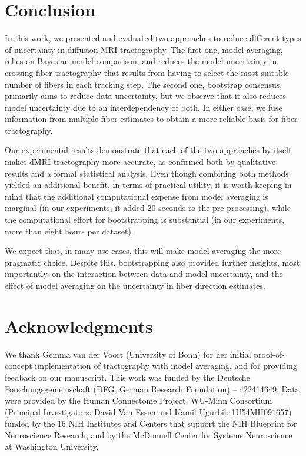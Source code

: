 \section{Conclusion}
\label{sec:conclusion}
In this work, we presented and evaluated two approaches to reduce different types of uncertainty in diffusion MRI tractography. The first one, model averaging, relies on Bayesian model comparison, and reduces the model uncertainty in crossing fiber tractography that results from having to select the most suitable number of fibers in each tracking step. The second one, bootstrap consensus, primarily aims to reduce data uncertainty, but we observe that it also reduces model uncertainty due to an interdependency of both. In either case, we fuse information from multiple fiber estimates to obtain a more reliable basis for fiber tractography.

Our experimental results demonstrate that each of the two approaches by itself makes dMRI tractography more accurate, as confirmed both by qualitative results and a formal statistical analysis. Even though combining both methods yielded an additional benefit, in terms of practical utility, it is worth keeping in mind that the additional computational expense from model averaging is marginal (in our experiments, it added 20 seconds to the pre-processing), while the computational effort for bootstrapping is substantial (in our experiments, more than eight hours per dataset).

We expect that, in many use cases, this will make model averaging the more pragmatic choice. Despite this, bootstrapping also provided further insights, most importantly, on the interaction between data and model uncertainty, and the effect of model averaging on the uncertainty in fiber direction estimates.

\section*{Acknowledgments}

We thank Gemma van der Voort (University of Bonn) for her initial proof-of-concept implementation of tractography with model averaging, and for providing feedback on our manuscript. This work was funded by the Deutsche Forschungsgemeinschaft (DFG, German Research Foundation) -- 422414649.
Data were provided by the Human Connectome Project, WU-Minn Consortium (Principal Investigators: David Van Essen and Kamil Ugurbil; 1U54MH091657) funded by the 16 NIH Institutes and Centers that support the NIH Blueprint
for Neuroscience Research; and by the McDonnell Center for Systems Neuroscience at Washington University.

